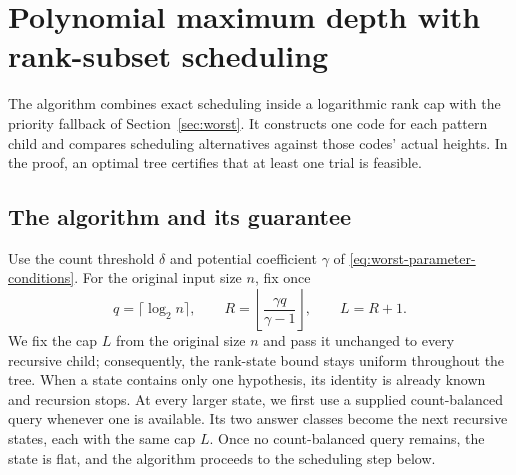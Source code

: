 \section{Polynomial maximum depth with rank-subset scheduling}
\label{sec:polynomial-slots}

The algorithm combines exact scheduling inside a logarithmic rank cap
with the priority fallback of Section~\ref{sec:worst}. It constructs
one code for each pattern child and compares scheduling alternatives
against those codes' actual heights. In the proof, an optimal tree
certifies that at least one trial is feasible.

\subsection{The algorithm and its guarantee}

Use the count threshold $\delta$ and potential coefficient $\gamma$
of \eqref{eq:worst-parameter-conditions}. For the original input size
$n$, fix once
\begin{equation}\label{eq:global-slot-cap}
 q=\lceil\log_2n\rceil,\qquad
 R=\left\lfloor\frac{\gamma q}{\gamma-1}\right\rfloor,
 \qquad L=R+1.
\end{equation}
We fix the cap $L$ from the original size $n$ and pass it unchanged to
every recursive child; consequently, the rank-state bound stays uniform
throughout the tree. When a state contains only one hypothesis, its
identity is already known and recursion stops. At every larger state,
we first use a supplied count-balanced query whenever one is available.
Its two answer classes become the next recursive states, each with the
same cap $L$. Once no count-balanced query remains, the state is flat,
and the algorithm proceeds to the scheduling step below.

